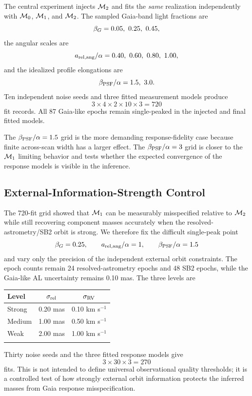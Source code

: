 The central experiment injects $\mathcal{M}_2$ and fits the \emph{same} realization independently with $\mathcal{M}_0$, $\mathcal{M}_1$, and $\mathcal{M}_2$. The sampled Gaia-band light fractions are
\begin{equation}
\betag=0.05,\ 0.25,\ 0.45,
\end{equation}
the angular scales are
\begin{equation}
a_{\rm rel,ang}/\alpha=0.40,\ 0.60,\ 0.80,\ 1.00,
\end{equation}
and the idealized profile elongations are
\begin{equation}
\beta_{\rm PSF}/\alpha=1.5,\ 3.0.
\end{equation}
Ten independent noise seeds and three fitted measurement models produce
\begin{equation}
3\times4\times2\times10\times3=720
\end{equation}
fit records. All 87 Gaia-like epochs remain single-peaked in the injected and final fitted models.

The $\beta_{\rm PSF}/\alpha=1.5$ grid is the more demanding response-fidelity case because finite across-scan width has a larger effect. The $\beta_{\rm PSF}/\alpha=3$ grid is closer to the $\mathcal{M}_1$ limiting behavior and tests whether the expected convergence of the response models is visible in the inference.

\subsection{External-Information-Strength Control}

The 720-fit grid showed that $\mathcal{M}_1$ can be measurably misspecified relative to $\mathcal{M}_2$ while still recovering component masses accurately when the resolved-astrometry/SB2 orbit is strong. We therefore fix the difficult single-peak point
\begin{equation}
\beta_G=0.25,\qquad a_{\rm rel,ang}/\alpha=1,\qquad \beta_{\rm PSF}/\alpha=1.5
\label{eq:controlpoint}
\end{equation}
and vary only the precision of the independent external orbit constraints. The epoch counts remain 24 resolved-astrometry epochs and 48 SB2 epochs, while the Gaia-like AL uncertainty remains 0.10 mas. The three levels are
\begin{center}
\begin{tabular}{lcc}
\hline\noalign{\smallskip}
Level & $\sigma_{\rm rel}$ & $\sigma_{\rm RV}$\\
\hline\noalign{\smallskip}
Strong & 0.20 mas & 0.10 km s$^{-1}$\\
Medium & 1.00 mas & 0.50 km s$^{-1}$\\
Weak & 2.00 mas & 1.00 km s$^{-1}$\\
\noalign{\smallskip}\hline
\end{tabular}
\end{center}
Thirty noise seeds and the three fitted response models give
\begin{equation}
3\times30\times3=270
\end{equation}
fits. This is not intended to define universal observational quality thresholds; it is a controlled test of how strongly external orbit information protects the inferred masses from Gaia response misspecification.

